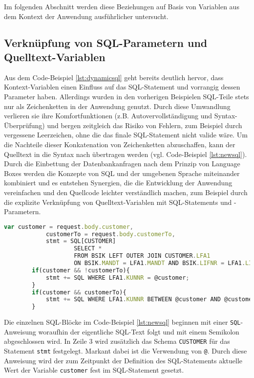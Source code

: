 Im folgenden Abschnitt werden diese Beziehungen auf Basis von Variablen aus dem Kontext der Anwendung ausführlicher untersucht.


\subsection{Verkn{\"u}pfung von SQL-Parametern und Quelltext-Variablen}\label{sec:sqlandsourcecode}
Aus dem Code-Beispiel \ref{lst:dynamicsql} geht bereits deutlich hervor, dass Kontext-Variablen einen Einfluss auf das SQL-Statement und vorrangig dessen Parameter haben.
Allerdings wurden in den vorherigen Beispielen SQL-Teile stets nur als Zeichenketten in der Anwendung genutzt.
Durch diese Umwandlung verlieren sie ihre Komfortfunktionen (z.B. Autovervollständigung und Syntax-Überprüfung) und bergen zeitgleich das Risiko von Fehlern, zum Beispiel durch vergessene Leerzeichen, ohne die das finale SQL-Statement nicht valide wäre.
Um die Nachteile dieser Konkatenation von Zeichenketten abzuschaffen, kann der Quelltext in die Syntax nach \cite{Horschig2014} übertragen werden (vgl. Code-Beispiel \ref{lst:newsql}).
Durch die Einbettung der Datenbankanfragen nach dem Prinzip von Language Boxes \cite{diekmann2013parsing} werden die Konzepte von SQL und der umgebenen Sprache miteinander kombiniert und es entstehen Synergien, die die Entwicklung der Anwendung vereinfachen und den Quellcode leichter verständlich machen, zum Beispiel durch die explizite Verknüpfung von Quelltext-Variablen mit SQL-Statements und -Parametern.

	\begin{lstlisting}[caption={Übertragung des Code-Beispiels \ref{lst:dynamicsql} in die Syntax nach \cite{Horschig2014}}, label={lst:newsql}, language=JavaScript]
		var customer = request.body.customer,
		    customerTo = request.body.customerTo,
		    stmt = SQL[CUSTOMER]
					SELECT *
					FROM BSIK LEFT OUTER JOIN CUSTOMER.LFA1
					ON BSIK.MANDT = LFA1.MANDT AND BSIK.LIFNR = LFA1.LIFNR;
		if(customer && !customerTo){
			stmt += SQL WHERE LFA1.KUNNR = @customer;
		}
		if(customer && customerTo){
			stmt += SQL WHERE LFA1.KUNNR BETWEEN @customer AND @customerTo;
		}
	\end{lstlisting}

Die einzelnen SQL-Blöcke im Code-Beispiel \ref{lst:newsql} beginnen mit einer \texttt{SQL}-Anweisung woraufhin der eigentliche SQL-Text folgt und mit einem Semikolon abgeschlossen wird.
In Zeile 3 wird zusätzlich das Schema \texttt{CUSTOMER} für das Statement \texttt{stmt} festgelegt.
Markant dabei ist die Verwendung von \texttt{@}.
Durch diese Anweisung wird der zum Zeitpunkt der Definition des SQL-Statements aktuelle Wert der Variable \texttt{customer} fest im SQL-Statement gesetzt.

